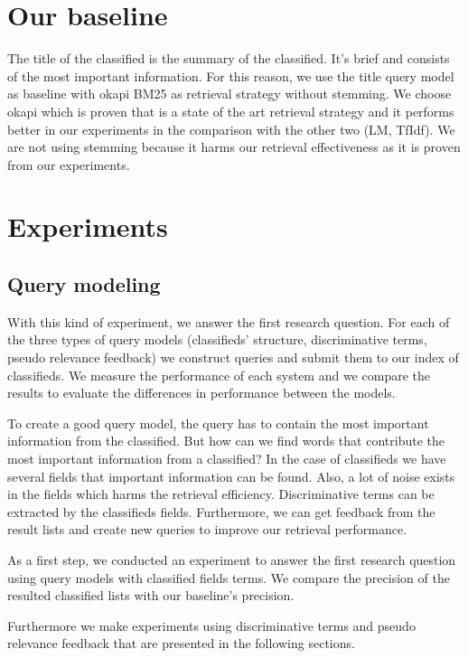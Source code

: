 \section{Our baseline}
The title of the classified is the summary of the classified. It's brief and consists of the most important information. For this reason, we use the title query model as baseline with okapi BM25 as retrieval strategy without stemming. We choose okapi which is proven that is a state of the art retrieval strategy and it performs better in our experiments in the comparison with the other two (LM, TfIdf). We are not using stemming because it harms our retrieval effectiveness as it is proven from our experiments.


\section{Experiments}

\subsection{Query modeling}
With this kind of experiment, we answer the first research question. For each of the three types of query models (classifieds' structure, discriminative terms, pseudo relevance feedback) we construct queries and submit them to our index of classifieds. We measure the performance of each system and we compare the results to evaluate the differences in performance between the models.


To create a good query model, the query has to contain the most important information from the classified. But how can we find words that contribute the most important information from a classified? In the case of classifieds we have several fields that important information can be found. Also, a lot of noise exists in the fields which harms the retrieval efficiency. Discriminative terms can be extracted by the classifieds fields. Furthermore, we can get feedback from the result lists and create new queries to improve our retrieval performance.

As a first step, we conducted an experiment to answer the first research question using query models with classified fields terms. We compare the precision of the resulted classified lists with our baseline's precision. 

Furthermore we make experiments using discriminative terms and pseudo relevance feedback that are presented in the following sections.

